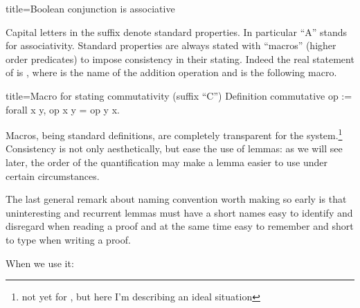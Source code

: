 \begin{coq}{title=Boolean conjunction is associative}





Capital letters in the suffix denote standard properties.
In particular ``A'' stands for associativity.  Standard properties are
always stated with ``macros'' (higher order predicates) to impose
consistency in their stating.  Indeed the real statement of
 is , where  is the
name of the addition operation and  is the
following macro.

\begin{coq}{title=Macro for stating commutativity (suffix ``C'')}
Definition commutative op := forall x y, op x y = op y x.
\end{coq}

Macros, being standard definitions, are completely transparent for the
system.\footnote{not yet for , but here I'm describing an ideal
situation}  Consistency is not only aesthetically, but ease the use of
lemmas: as we will see later, the order of the quantification may make
a lemma easier to use under certain circumstances.

The last general remark about naming convention worth making so early is that
uninteresting and recurrent lemmas must have a short names easy to identify and
disregard when reading a proof and at the same time easy to remember and short
to type when writing a proof.



When we use it:


\end{coq}
